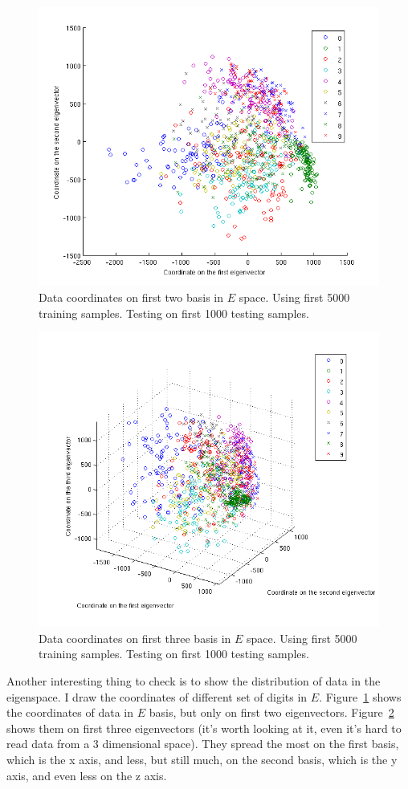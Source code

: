 \documentclass[10pt]{article}
\begin{document}
\hfill

\begin{figure}
\centering
\includegraphics[width=0.55\columnwidth]{twod_digit.png}
\caption{Data coordinates on first two basis in $E$ space.  Using
first 5000 training samples. Testing on first 1000 testing samples.}
\label{fig:twod}
\end{figure}

\begin{figure}
\centering
\includegraphics[width=0.55\columnwidth]{threed_digit.png}
\caption{Data coordinates on first three basis in $E$ space.  Using
first 5000 training samples. Testing on first 1000 testing samples.}
\label{fig:threed}
\end{figure}

Another interesting thing to check is to show the distribution of data
in the eigenspace. I draw the coordinates of different
set of digits in $E$. Figure~\ref{fig:twod} shows the coordinates of
data in $E$ basis, but only on first two eigenvectors.
Figure~\ref{fig:threed} shows them on first three eigenvectors (it's
worth looking at it, even it's hard to read data from a 3 dimensional
space). They
spread the most on the first basis, which is the x axis, and less, but
still much, on the second basis, which is the y axis, and even less on
the z axis.
\end{document}
